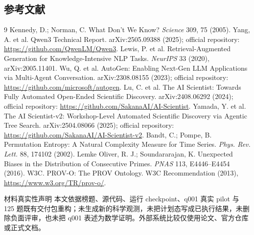 \documentclass[10pt,a4paper,UTF8]{ctexart}
\begin{document}
\subsection*{参考文献}
\begin{thebibliography}{9}\setlength{\itemsep}{0.4pt}\setlength{\parskip}{0pt}
 Kennedy, D.; Norman, C. What Don't We Know? \textit{Science} 309, 75 (2005).
 Yang, A. et al. Qwen3 Technical Report. arXiv:2505.09388 (2025); official repository: \url{https://github.com/QwenLM/Qwen3}.
 Lewis, P. et al. Retrieval-Augmented Generation for Knowledge-Intensive NLP Tasks. \textit{NeurIPS} 33 (2020), arXiv:2005.11401.
 Wu, Q. et al. AutoGen: Enabling Next-Gen LLM Applications via Multi-Agent Conversation. arXiv:2308.08155 (2023); official repository: \url{https://github.com/microsoft/autogen}.
 Lu, C. et al. The AI Scientist: Towards Fully Automated Open-Ended Scientific Discovery. arXiv:2408.06292 (2024); official repository: \url{https://github.com/SakanaAI/AI-Scientist}.
 Yamada, Y. et al. The AI Scientist-v2: Workshop-Level Automated Scientific Discovery via Agentic Tree Search. arXiv:2504.08066 (2025); official repository: \url{https://github.com/SakanaAI/AI-Scientist-v2}.
 Bandt, C.; Pompe, B. Permutation Entropy: A Natural Complexity Measure for Time Series. \textit{Phys. Rev. Lett.} 88, 174102 (2002).
 Lemke Oliver, R. J.; Soundararajan, K. Unexpected Biases in the Distribution of Consecutive Primes. \textit{PNAS} 113, E4446--E4454 (2016).
 W3C. PROV-O: The PROV Ontology. W3C Recommendation (2013), \url{https://www.w3.org/TR/prov-o/}.
\end{thebibliography}

\vfill
\begin{boundarybox}{材料真实性声明}
本文依据榜题、源代码、运行 checkpoint、q001 真实 pilot 与 125 题既有交付包重构；未生成新的科学观测，未把计划态写成已执行结果，未删除负面评审，也未把 q001 表述为数学证明。外部系统比较仅使用论文、官方仓库或正式文档。
\end{boundarybox}
\end{document}
